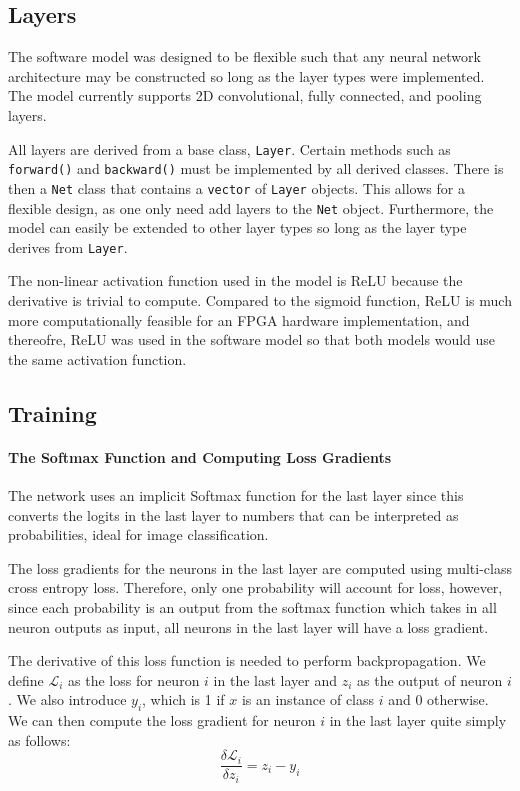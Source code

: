 \subsection{Layers}
The software model was designed to be flexible such that any neural network architecture may be constructed so long as the layer types were implemented. The model currently supports 2D convolutional, fully connected, and pooling layers. 
\par 
All layers are derived from a base class, \texttt{Layer}. Certain methods such as \texttt{forward()} and \texttt{backward()} must be implemented by all derived classes. There is then a \texttt{Net} class that contains a \texttt{vector} of \texttt{Layer} objects. This allows for a flexible design, as one only need add layers to the \texttt{Net} object. Furthermore, the model can easily be extended to other layer types so long as the layer type derives from \texttt{Layer}. 
\par
The non-linear activation function used in the model is ReLU because the derivative is trivial to compute. Compared to the sigmoid function, ReLU is much more computationally feasible for an FPGA hardware implementation, and thereofre, ReLU was used in the software model so that both models would use the same activation function.
\subsection{Training}
\paragraph{The Softmax Function and Computing Loss Gradients}
The network uses an implicit Softmax function for the last layer since this converts the logits in the last layer to numbers that can be interpreted as probabilities, ideal for image classification. 
\par
The loss gradients for the neurons in the last layer are computed using multi-class cross entropy loss. Therefore, only one probability will account for loss, however, since each probability is an output from the softmax function which takes in all neuron outputs as input, all neurons in the last layer will have a loss gradient.
\par 
The derivative of this loss function is needed to perform backpropagation. We define $\mathcal{L}_i$ as the loss for neuron $i$ in the last layer and $z_i$ as the output of neuron $i$. We also introduce $y_i$, which is 1 if $x$ is an instance of class $i$ and 0 otherwise. We can then compute the loss gradient for neuron $i$ in the last layer quite simply as follows: 
\[    
\frac{\delta \mathcal{L}_i}{\delta z_i} = z_i - y_i
\]

